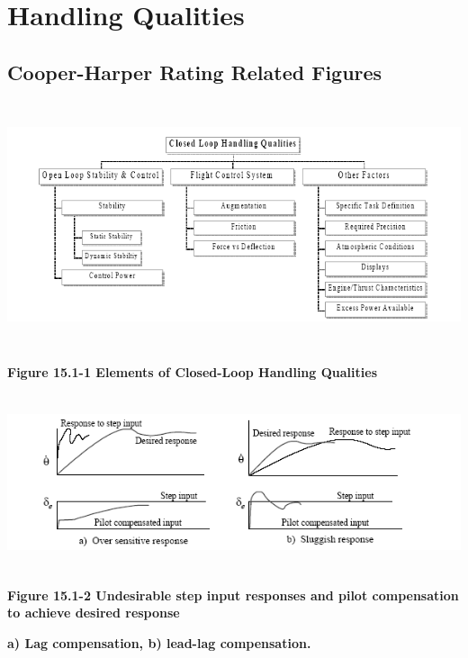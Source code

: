 \documentclass[
]{book}
\begin{document}
\hypertarget{handling-qualities}{%
\chapter{Handling Qualities}\label{handling-qualities}}

\hypertarget{cooper-harper-rating-related-figures}{%
\section{Cooper-Harper Rating Related Figures}\label{cooper-harper-rating-related-figures}}

\includegraphics[width=6.5in,height=2.84444in]{media/15/image1.png}

\textbf{Figure 15.1-1 Elements of Closed-Loop Handling Qualities}

\includegraphics[width=6.80903in,height=2.03333in]{media/15/image2.png}

\textbf{Figure 15.1-2 Undesirable step input responses and pilot compensation to
achieve desired response}

\textbf{a) Lag compensation, b) lead-lag compensation.}
\end{document}
